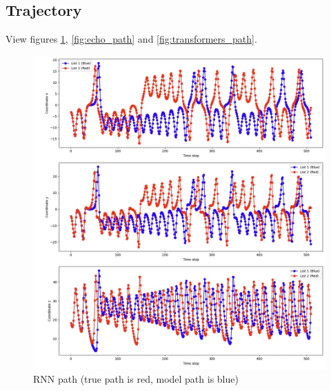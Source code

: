 \documentclass[11pt]{article}
\begin{document}
\subsection{Trajectory}
View figures \ref{fig:rnn_path}, \ref{fig:echo_path} and \ref{fig:transformers_path}.
\begin{figure}
    \centering
    \begin{minipage}[b]{0.49\textwidth}
        \includegraphics[width=\linewidth]{rnn_path.jpeg}
        \caption{RNN path (true path is red, model path is blue)}
        \label{fig:rnn_path}
    \end{minipage}
    \hfill %
    \begin{minipage}[b]{0.49\textwidth}

\end{minipage}
\end{figure}
\end{document}
